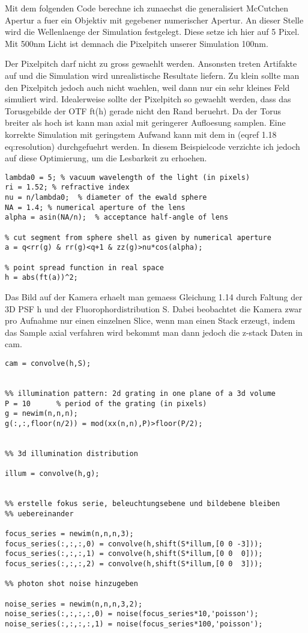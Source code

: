 Mit dem folgenden Code berechne ich zunaechst die generalisiert
McCutchen Apertur a fuer ein Objektiv mit gegebener numerischer
Apertur. An dieser Stelle wird die Wellenlaenge der Simulation
festgelegt. Diese setze ich hier auf 5 Pixel. Mit 500nm Licht ist
demnach die Pixelpitch unserer Simulation 100nm. 

 Der Pixelpitch darf nicht zu gross gewaehlt werden. Ansonsten treten
Artifakte auf und die Simulation wird unrealistische Resultate
liefern. Zu klein sollte man den Pixelpitch jedoch auch nicht
waehlen, weil dann nur ein sehr kleines Feld simuliert wird.
Idealerweise sollte der Pixelpitch so gewaehlt werden, dass das
Torusgebilde der OTF ft(h) gerade nicht den Rand beruehrt. Da der
Torus breiter als hoch ist kann man axial mit geringerer Aufloesung
samplen. Eine korrekte Simulation mit geringstem Aufwand kann mit
dem in (eqref 1.18 eq:resolution) durchgefuehrt werden.  In diesem
Beispielcode verzichte ich jedoch auf diese Optimierung, um die
Lesbarkeit zu erhoehen.


\begin{lstlisting}[style=mymatlab]
%% incoherent 3d point spread function
lambda0 = 5; % vacuum wavelength of the light (in pixels)
ri = 1.52; % refractive index
nu = n/lambda0;  % diameter of the ewald sphere 
NA = 1.4; % numerical aperture of the lens
alpha = asin(NA/n);  % acceptance half-angle of lens

% cut segment from sphere shell as given by numerical aperture
a = q<rr(g) & rr(g)<q+1 & zz(g)>nu*cos(alpha);  

% point spread function in real space
h = abs(ft(a))^2;
\end{lstlisting}

Das Bild auf der Kamera erhaelt man gemaess Gleichung 1.14 durch
Faltung der 3D PSF h und der Fluorophordistribution S. Dabei
beobachtet die Kamera zwar pro Aufnahme nur einen einzelnen Slice,
wenn man einen Stack erzeugt, indem das Sample axial verfahren wird
bekommt man dann jedoch die z-stack Daten in cam.

\begin{lstlisting}[style=mymatlab]
%% image of the 3d fluorophore distribution
cam = convolve(h,S);


%% illumination pattern: 2d grating in one plane of a 3d volume
P = 10      % period of the grating (in pixels)
g = newim(n,n,n);
g(:,:,floor(n/2)) = mod(xx(n,n),P)>floor(P/2);


%% 3d illumination distribution

illum = convolve(h,g);


%% erstelle fokus serie, beleuchtungsebene und bildebene bleiben
%% uebereinander

focus_series = newim(n,n,n,3);
focus_series(:,:,:,0) = convolve(h,shift(S*illum,[0 0 -3]));
focus_series(:,:,:,1) = convolve(h,shift(S*illum,[0 0  0]));
focus_series(:,:,:,2) = convolve(h,shift(S*illum,[0 0  3]));

%% photon shot noise hinzugeben

noise_series = newim(n,n,n,3,2);
noise_series(:,:,:,:,0) = noise(focus_series*10,'poisson');
noise_series(:,:,:,:,1) = noise(focus_series*100,'poisson');
\end{lstlisting}

